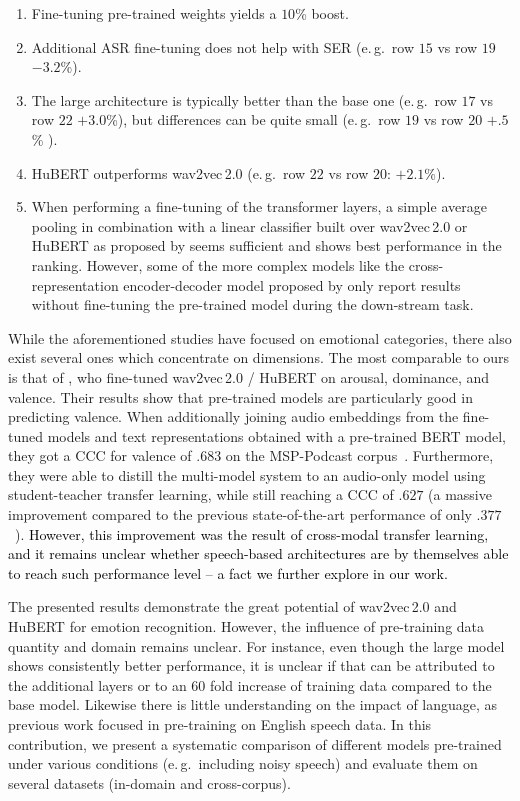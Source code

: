 \documentclass{article}
\newcommand{\review}[1]{\textcolor{black}{#1}}
\newcommand\msppodcast{\mbox{MSP-Podcast}}
\newcommand{\wtov}{wav2vec\,2.0}
\newcommand{\hubert}{HuBERT}
\newcommand{\eg}{e.\,g.\ }
\begin{document}
\begin{enumerate}
    \item Fine-tuning pre-trained weights yields a $10$\% boost.
    \item Additional \ac{ASR} fine-tuning does not help with \ac{SER} (\eg row $15$ vs row $19$ $-3.2$\%).
    \item The large architecture is typically better than the base one (\eg row $17$ vs row $22$ $+3.0$\%),
    but differences can be quite small (\eg row $19$ vs row $20$ $+.5$\% ).
    \item {\hubert} outperforms {\wtov} (\eg row $22$ vs row $20$: $+2.1$\%).
    \item When performing a fine-tuning of the transformer layers,
    a simple average pooling in combination with a linear classifier built over {\wtov} or {\hubert}
    as proposed by \citet{wang2021finetuned}
    seems sufficient and shows best performance in the ranking.
    However, some of the more complex models
    like the cross-representation encoder-decoder model proposed by \citet{makiuchi2021multimodal}
    only report results without fine-tuning the pre-trained model during the down-stream task.
\end{enumerate}

While the aforementioned studies have focused on emotional categories,
there also exist several ones
which concentrate on dimensions.
The most comparable to ours is that of \citet{srinivasan2021representation},
who fine-tuned {\wtov} / {\hubert} on arousal, dominance, and valence.
Their results show that pre-trained models are particularly good in predicting valence.
When additionally joining audio embeddings from the fine-tuned models
and text representations obtained with a pre-trained BERT model,
they got a \acf{CCC} for valence of $.683$
on the {\msppodcast} corpus~\citep{lotfian2019msppodcast}.
Furthermore, they were able to distill the multi-model system
to an audio-only model using student-teacher transfer learning,
while still reaching a \ac{CCC} of $.627$
(a massive improvement compared to the previous state-of-the-art performance of only $.377$~\citep{li2021contrastive}).
\review{
However, 
this improvement was the result of cross-modal transfer learning, 
and it remains unclear whether speech-based architectures
are by themselves able
to reach such performance level
-- a fact we further explore in our work.
}

The presented results demonstrate the great potential of {\wtov} and {\hubert} for emotion recognition. 
However, the influence of pre-training data quantity and domain remains unclear.
For instance, even though the large model shows consistently better performance,
it is unclear if that can be attributed to the additional layers
or to an $60$ fold increase of training data compared to the base model. 
Likewise there is little understanding on the impact of language,
as previous work focused in pre-training on English speech data.
In this contribution,
we present a systematic comparison of different models
pre-trained under various conditions
(\eg including noisy speech)
and evaluate them on several datasets
(in-domain and cross-corpus).
\end{document}
